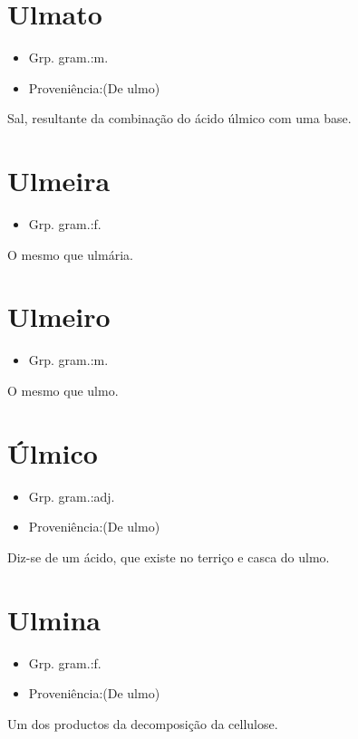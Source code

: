 \documentclass{article}
\begin{document}
\section{Ulmato}
\begin{itemize}
\item {Grp. gram.:m.}
\end{itemize}
\begin{itemize}
\item {Proveniência:(De \textunderscore ulmo\textunderscore )}
\end{itemize}
Sal, resultante da combinação do ácido úlmico com uma base.
\section{Ulmeira}
\begin{itemize}
\item {Grp. gram.:f.}
\end{itemize}
O mesmo que \textunderscore ulmária\textunderscore .
\section{Ulmeiro}
\begin{itemize}
\item {Grp. gram.:m.}
\end{itemize}
O mesmo que \textunderscore ulmo\textunderscore .
\section{Úlmico}
\begin{itemize}
\item {Grp. gram.:adj.}
\end{itemize}
\begin{itemize}
\item {Proveniência:(De \textunderscore ulmo\textunderscore )}
\end{itemize}
Diz-se de um ácido, que existe no terriço e casca do ulmo.
\section{Ulmina}
\begin{itemize}
\item {Grp. gram.:f.}
\end{itemize}
\begin{itemize}
\item {Proveniência:(De \textunderscore ulmo\textunderscore )}
\end{itemize}
Um dos productos da decomposição da cellulose.
\end{document}
